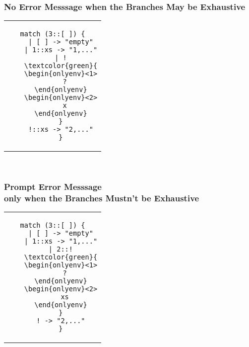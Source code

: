 \documentclass[notheorems]{beamer}
\theoremstyle{slplain}
\numberwithin{thm}{section}
\begin{document}
\begin{frame}[fragile]
  \frametitle{No Error Messsage when the Branches May be Exhaustive}
\begin{center}
\begin{tabular}{c}
  \begin{lstlisting}[escapechar=!]
    match (3::[ ]) {
    | [ ] -> "empty"
    | 1::xs -> "1,..."
    | !
    \textcolor{green}{
    \begin{onlyenv}<1>
      ?
    \end{onlyenv}
    \begin{onlyenv}<2>
      x
    \end{onlyenv}
    }
    !::xs -> "2,..."
    }
  \end{lstlisting}
\end{tabular}
\\
\vspace{1cm}
\end{center}
\end{frame}

\begin{frame}[fragile]
  \frametitle{Prompt Error Messsage \\ only when the Branches Mustn't be Exhaustive}
\begin{center}
\begin{tabular}{c}
  \begin{lstlisting}[escapechar=!]
    match (3::[ ]) {
    | [ ] -> "empty"
    | 1::xs -> "1,..."
    | 2::!
    \textcolor{green}{
    \begin{onlyenv}<1>
      ?
    \end{onlyenv}
    \begin{onlyenv}<2>
      xs
    \end{onlyenv}
    }
    ! -> "2,..."
    }
  \end{lstlisting}
\end{tabular}
\\
\vspace{1cm}
\end{center}
\end{frame}
\end{document}
